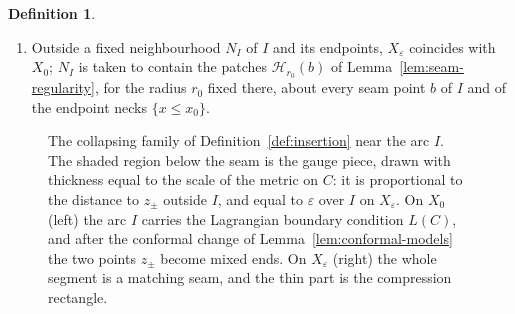 \documentclass[11pt]{amsart}
\theoremstyle{definition}
\newtheorem{definition}[theorem]{Definition}
\theoremstyle{remark}
\theoremstyle{plain}
\numberwithin{equation}{section}
\newcommand{\eps}{\varepsilon}
\begin{document}
\begin{definition}
\begin{enumerate}[label=(\roman*)]
  $0\le\theta<\theta_0$, a fixed small angle, with $\sigma=\pm1$ at the right
  and left endpoints and $b_\eps$ a cutoff equal to $0$ for $x\le\eps$ and
  $1$ for $x\ge2\eps$. On $I$ it is $t+i\eps\theta$; for $x\ge2\eps$ it is
  the polar collar $z_\pm\pm xe^{\pm i\theta}$. For $\theta$ in this range
  $F_\eps$ is an embedding.
\item Outside a fixed neighbourhood $N_I$ of $I$ and its endpoints, $X_\eps$
  coincides with $X_0$; $N_I$ is taken to contain the patches $\mathcal H_{r_0}(b)$ of
  Lemma~\ref{lem:seam-regularity}, for the radius $r_0$ fixed there, about every seam point $b$
  of $I$ and of the endpoint necks $\{x\le x_0\}$.
\end{enumerate}
\end{definition}

\begin{figure}[ht]
\centering
{}
\caption{The collapsing family of Definition~\ref{def:insertion} near the arc $I$. The
shaded region below the seam is the gauge piece, drawn with thickness equal to
the scale of the metric on $C$: it is proportional to the distance to $z_\pm$ outside
$I$, and equal to $\eps$ over $I$ on $X_\eps$. On $X_0$ (left) the arc $I$ carries the
Lagrangian boundary condition $L(C)$, and after the conformal change of
Lemma~\ref{lem:conformal-models} the two points $z_\pm$ become mixed ends. On
$X_\eps$ (right) the whole segment is a matching seam, and the thin part is the
compression rectangle.}
\label{fig:collapse}
\end{figure}
\end{document}
